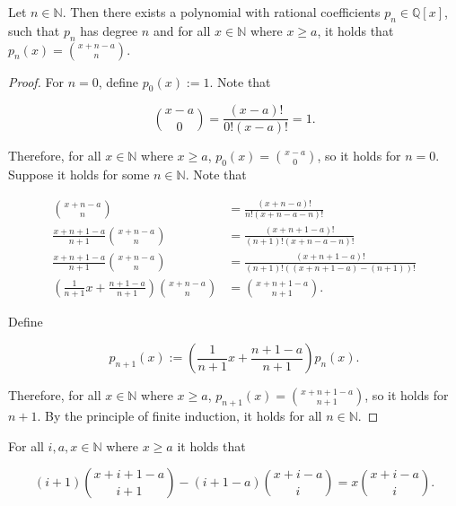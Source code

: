 \documentclass[12pt]{article}
\begin{document}
\vspace{20px}

\begin{lemma}
    \label{binomial_degree}

    Let $n \in \mathbb{N}$. Then there exists a polynomial with rational coefficients $p_n \in \mathbb Q[x]$, such that $p_n$ has degree $n$ and for all $x\in \mathbb{N}$ where $x \geq a$, it holds that $p_n(x) = \binom{x+n-a}{n}$.

\end{lemma}

\begin{proof}

    For $n = 0$, define $p_0(x) := 1$. Note that

    $$
        \binom{x-a}{0} = \frac{(x-a)!}{0!(x-a)!} = 1.
    $$

    Therefore, for all $x \in \mathbb{N}$ where $x \geq a$, $p_0(x) = \binom{x-a}{0}$, so it holds for $n = 0$. Suppose it holds for some $n \in \mathbb{N}$. Note that

    \begin{align*}
        \binom{x+n-a}{n}                                                   & = \frac{(x+n-a)!}{n!(x+n-a-n)!}               \\
        \frac{x+n+1-a}{n+1}\binom{x+n-a}{n}                                & = \frac{(x+n+1-a)!}{(n+1)!(x+n-a-n)!}         \\
        \frac{x+n+1-a}{n+1}\binom{x+n-a}{n}                                & = \frac{(x+n+1-a)!}{(n+1)!((x+n+1-a)-(n+1))!} \\
        \left( \frac{1}{n+1}x + \frac{n+1-a}{n+1} \right) \binom{x+n-a}{n} & = \binom{x+n+1-a}{n+1}.
    \end{align*}

    Define

    $$
        p_{n+1}(x) := \left( \frac{1}{n+1}x + \frac{n+1-a}{n+1} \right)p_n(x).
    $$

    Therefore, for all $\displaystyle x \in \mathbb{N}$ where $x \geq a$, $\displaystyle p_{n+1}(x) = \binom{x+n+1-a}{n+1}$, so it holds for $n+1$. By the principle of finite induction, it holds for all $n \in \mathbb{N}$.

\end{proof}

\vspace{20px}

\begin{lemma}
    \label{degree_elevation_identity}

    For all $i, a, x \in \mathbb{N}$ where $x \geq a$ it holds that

    $$
        (i+1)\binom{x+i+1-a}{i+1} - (i+1-a)\binom{x+i-a}{i} = x\binom{x+i-a}{i}.
    $$

\end{lemma}
\end{document}
